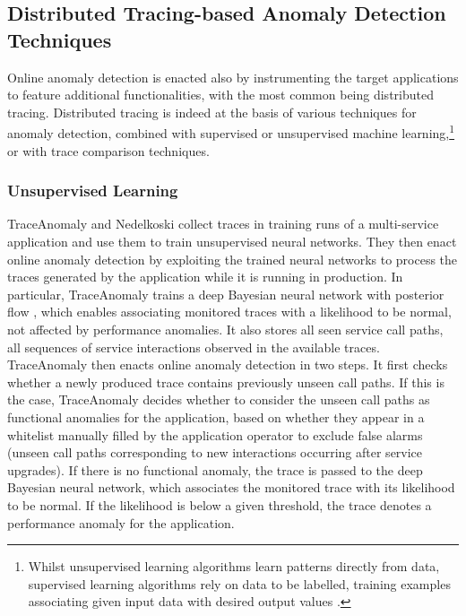 \subsection{Distributed Tracing-based Anomaly Detection Techniques}
\label{sec:detection:distributed-tracing}
Online anomaly detection is enacted also by instrumenting the target applications to feature additional functionalities, with the most common being distributed tracing.
Distributed tracing is indeed at the basis of various techniques for anomaly detection, combined with supervised or unsupervised machine learning,\footnote{Whilst unsupervised learning algorithms learn patterns directly from data, supervised learning algorithms rely on data to be labelled, \viz training examples associating given input data with desired output values \cite{Mitchell1997_MachineLearning}.} or with trace comparison techniques.

\subsubsection{Unsupervised Learning}
\label{sec:detection:distributed-tracing:unsupervised-learning}
TraceAnomaly \cite{16_Liu2020_TraceAnomaly} and Nedelkoski \etal \cite{35_Nedelkoski2019_AnomalyDetectionTracingData} collect traces in training runs of a multi-service application and use them to train unsupervised neural networks.
They then enact online anomaly detection by exploiting the trained neural networks to process the traces generated by the application while it is running in production.
In particular, TraceAnomaly \cite{16_Liu2020_TraceAnomaly} trains a deep Bayesian neural network with posterior flow \cite{Neal1996_BayesianNetwork,Rezende2015_NormalizingFlows}, which enables associating monitored traces with a likelihood to be normal, \viz not affected by performance anomalies.
It also stores all seen service call paths, \viz all sequences of service interactions observed in the available traces. 
TraceAnomaly \cite{16_Liu2020_TraceAnomaly} then enacts online anomaly detection in two steps.
It first checks whether a newly produced trace contains previously unseen call paths.
If this is the case, TraceAnomaly \cite{16_Liu2020_TraceAnomaly} decides whether to consider the unseen call paths as functional anomalies for the application, based on whether they appear in a whitelist manually filled by the application operator to exclude false alarms (\eg unseen call paths corresponding to new interactions occurring after service upgrades).
If there is no functional anomaly, the trace is passed to the deep Bayesian neural network, which associates the monitored trace with its likelihood to be normal.
If the likelihood is below a given threshold, the trace denotes a performance anomaly for the application.

